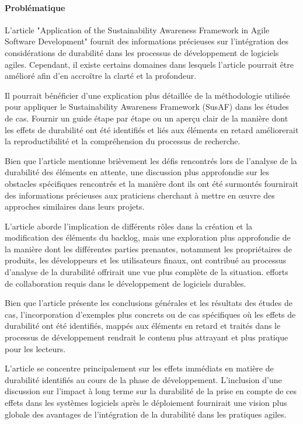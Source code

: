 \paragraph{Problématique}
L'article "Application of the Sustainability Awareness Framework in Agile Software Development" fournit des informations précieuses sur l'intégration des considérations de durabilité dans les processus de développement de logiciels agiles. Cependant, il existe certains domaines dans lesquels l'article pourrait être amélioré afin d'en accroître la clarté et la profondeur.

Il pourrait bénéficier d'une explication plus détaillée de la méthodologie utilisée pour appliquer le Sustainability Awareness Framework (SusAF) dans les études de cas. Fournir un guide étape par étape ou un aperçu clair de la manière dont les effets de durabilité ont été identifiés et liés aux éléments en retard améliorerait la reproductibilité et la compréhension du processus de recherche.

Bien que l'article mentionne brièvement les défis rencontrés lors de l'analyse de la durabilité des éléments en attente, une discussion plus approfondie sur les obstacles spécifiques rencontrés et la manière dont ils ont été surmontés fournirait des informations précieuses aux praticiens cherchant à mettre en œuvre des approches similaires dans leurs projets.

L'article aborde l'implication de différents rôles dans la création et la modification des éléments du backlog, mais une exploration plus approfondie de la manière dont les différentes parties prenantes, notamment les propriétaires de produits, les développeurs et les utilisateurs finaux, ont contribué au processus d'analyse de la durabilité offrirait une vue plus complète de la situation. efforts de collaboration requis dans le développement de logiciels durables.

Bien que l'article présente les conclusions générales et les résultats des études de cas, l'incorporation d'exemples plus concrets ou de cas spécifiques où les effets de durabilité ont été identifiés, mappés aux éléments en retard et traités dans le processus de développement rendrait le contenu plus attrayant et plus pratique pour les lecteurs.

L’article se concentre principalement sur les effets immédiats en matière de durabilité identifiés au cours de la phase de développement. L'inclusion d'une discussion sur l'impact à long terme sur la durabilité de la prise en compte de ces effets dans les systèmes logiciels après le déploiement fournirait une vision plus globale des avantages de l'intégration de la durabilité dans les pratiques agiles.

